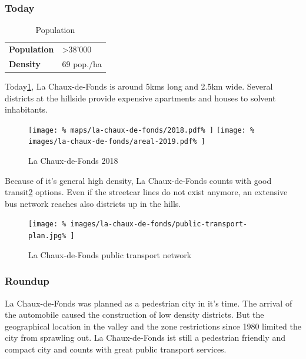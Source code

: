 \documentclass[twocolumn]{article}
\begin{document}
			
			\subsubsection{Today}			
			
			\begin{table}[H]			
				\centering
				\caption{Population}
				\label{table:la-chaux-de-fonds-population}
				\begin{tabular}{|l|l|}
					\hline
					\textbf{Population}  & \textgreater 38'000 \\
					\textbf{Density}     & 69 pop./ha \\
					\hline
				\end{tabular}
			\end{table}
			
			Today\ref{fig:map:la-chaux-de-fonds-2018}, La Chaux-de-Fonds is around 5kms long and 2.5km wide. Several districts at the hillside provide expensive apartments and houses to solvent inhabitants.
			
			\begin{figure}[H]
				\texttt{[image: \%
					maps/la-chaux-de-fonds/2018.pdf\%
				]}
				\texttt{[image: \%
					images/la-chaux-de-fonds/areal-2019.pdf\%
				]}
				\caption{La Chaux-de-Fonds 2018\cite{MapGeoAdmin:LaChauxDeFonds}}
				\label{fig:map:la-chaux-de-fonds-2018}
			\end{figure}
			
			Because of it's general high density, La Chaux-de-Fonds counts with good transit\ref{fig:la-chaux-de-fonds-public-transport} options. Even if the streetcar lines do not exist anymore, an extensive bus network reaches also districts up in the hills.
			
			
			
			\begin{figure}[H]
				\texttt{[image: \%
					images/la-chaux-de-fonds/public-transport-plan.jpg\%
				]}
				\caption{La Chaux-de-Fonds public transport network\cite{TransN:LaChauxDeFonds}}
				\label{fig:la-chaux-de-fonds-public-transport}
			\end{figure}
			
			
			\subsubsection{Roundup}
			La Chaux-de-Fonds was planned as a pedestrian city in it's time.
			The arrival of the automobile caused the construction of low density districts.
			But the geographical location in the valley and the zone restrictions since 1980 limited the city from sprawling out.
			La Chaux-de-Fonds ist still a pedestrian friendly and compact city and counts with great public transport services.
			
\end{document}
